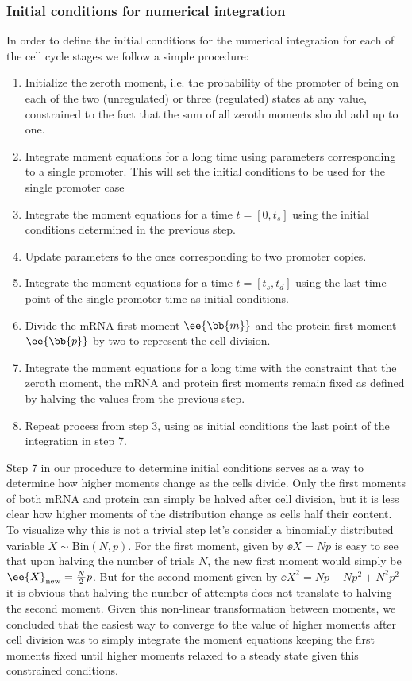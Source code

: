 \subsubsection{Initial conditions for numerical integration}

In order to define the initial conditions for the numerical integration for each
of the cell cycle stages we follow a simple procedure:
\begin{enumerate}
  \item Initialize the zeroth moment, i.e. the probability of the promoter of
  being on each of the two (unregulated) or three (regulated) states at any
  value, constrained to the fact that the sum of all zeroth moments should add
  up to one.
  \item Integrate moment equations for a long time using parameters
  corresponding to a single promoter. This will set the initial conditions to
  be used for the single promoter case
  \item Integrate the moment equations for a time $t = [0, t_s]$ using the
  initial conditions determined in the previous step.
  \item Update parameters to the ones corresponding to two promoter copies.
  \item Integrate the moment equations for a time $t = [t_s, t_d]$ using the
  last time point of the single promoter time as initial conditions.
  \item Divide the mRNA first moment $\ee{\bb{m}}$ and the protein first moment
  $\ee{\bb{p}}$ by two to represent the cell division.
  \item Integrate the moment equations for a long time with the constraint that
  the zeroth moment, the mRNA and protein first moments remain fixed as defined
  by halving the values from the previous step.
  \item Repeat process from step 3, using as initial conditions the last point
  of the integration in step 7.
\end{enumerate}

Step 7 in our procedure to determine initial conditions serves as a way to
determine how higher moments change as the cells divide. Only the first moments
of both mRNA and protein can simply be halved after cell division, but it is
less clear how higher moments of the distribution change as cells half their
content. To visualize why this is not a trivial step let's consider a binomially
distributed variable $X \sim \text{Bin}(N, p)$. For the first moment, given by
$\ee{X} = Np$ is easy to see that upon halving the number of trials $N$, the new
first moment would simply be $\ee{X}_{\text{new}} = {N \over 2} p$. But for the
second moment given by $\ee{X^2} = Np - Np^2 + N^2p^2$ it is obvious that
halving the number of attempts does not translate to halving the second moment.
Given this non-linear transformation between moments, we concluded that the
easiest way to converge to the value of higher moments after cell division was
to simply integrate the moment equations keeping the first moments fixed until
higher moments relaxed to a steady state given this constrained conditions.

